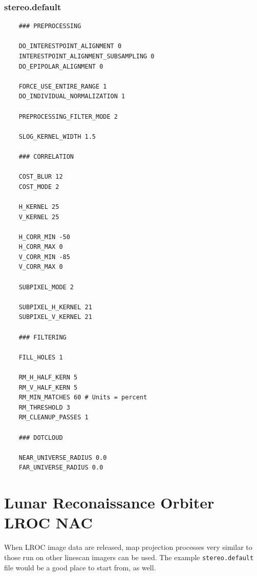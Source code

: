 \subsubsection*{stereo.default}

\begin{verbatim}
    ### PREPROCESSING

    DO_INTERESTPOINT_ALIGNMENT 0
    INTERESTPOINT_ALIGNMENT_SUBSAMPLING 0
    DO_EPIPOLAR_ALIGNMENT 0

    FORCE_USE_ENTIRE_RANGE 1
    DO_INDIVIDUAL_NORMALIZATION 1

    PREPROCESSING_FILTER_MODE 2

    SLOG_KERNEL_WIDTH 1.5

    ### CORRELATION

    COST_BLUR 12
    COST_MODE 2

    H_KERNEL 25
    V_KERNEL 25

    H_CORR_MIN -50
    H_CORR_MAX 0
    V_CORR_MIN -85
    V_CORR_MAX 0

    SUBPIXEL_MODE 2

    SUBPIXEL_H_KERNEL 21
    SUBPIXEL_V_KERNEL 21

    ### FILTERING

    FILL_HOLES 1

    RM_H_HALF_KERN 5
    RM_V_HALF_KERN 5
    RM_MIN_MATCHES 60 # Units = percent
    RM_THRESHOLD 3
    RM_CLEANUP_PASSES 1

    ### DOTCLOUD

    NEAR_UNIVERSE_RADIUS 0.0
    FAR_UNIVERSE_RADIUS 0.0
\end{verbatim}

\section{Lunar Reconaissance Orbiter LROC NAC}

When \ac{LROC} image data are released, map projection processes
very similar to those run on other linescan imagers can be used.
The example \texttt{stereo.default} file would be a good place to
start from, as well.

% 
% 

